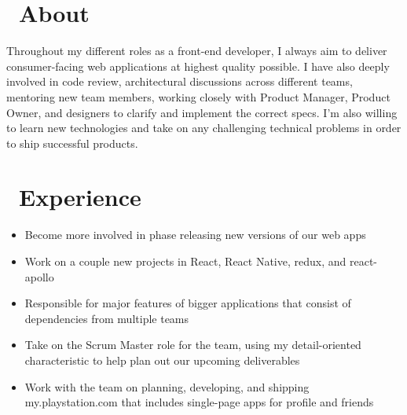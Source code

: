 \documentclass{resume}
\begin{document}



\section{\faInfo\ About}
Throughout my different roles as a front-end developer, I always aim to deliver consumer-facing web applications at highest quality possible. I have also deeply involved in code review, architectural discussions across different teams, mentoring new team members, working closely with Product Manager, Product Owner, and designers to clarify and implement the correct specs. I’m also willing to learn new technologies and take on any challenging technical problems in order to ship successful products.

\section{\faUsers\ Experience}
\begin{itemize}
  \item Become more involved in phase releasing new versions of our web apps
  \item Work on a couple new projects in React, React Native, redux, and react-apollo
  \item Responsible for major features of bigger applications that consist of dependencies from multiple teams
\end{itemize}

\begin{itemize}
  \item Take on the Scrum Master role for the team, using my detail-oriented characteristic to help plan out our upcoming deliverables
  \item Work with the team on planning, developing, and shipping my.playstation.com that includes single-page apps for profile and friends
\end{itemize}
\end{document}
